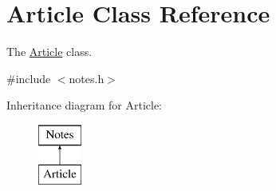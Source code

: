 \hypertarget{class_article}{}\section{Article Class Reference}
\label{class_article}


The \hyperlink{class_article}{Article} class.  




{\ttfamily \#include $<$notes.\+h$>$}

Inheritance diagram for Article\+:\begin{figure}[H]
\begin{center}
\leavevmode
\includegraphics[height=2.000000cm]{class_article}
\end{center}
\end{figure}
